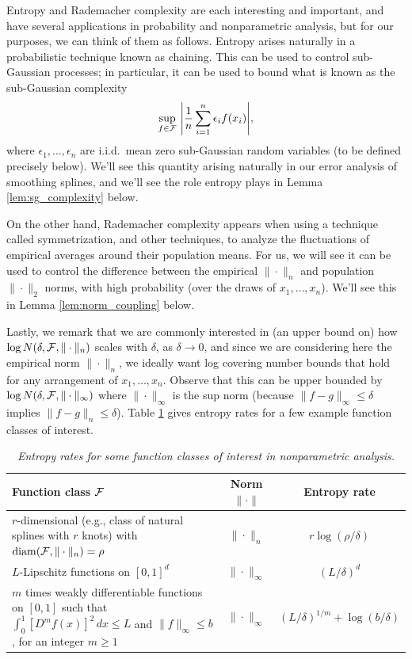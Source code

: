 \documentclass{article}
\begin{document}

Entropy and Rademacher complexity are each interesting and important, and have
several applications in probability and nonparametric analysis, but for our
purposes, we can think of them as follows. Entropy arises naturally in a
probabilistic technique known as chaining. This can be used to control
sub-Gaussian processes; in particular, it can be used to bound what is known as
the sub-Gaussian complexity   
\[
\sup_{f \in \mathcal{F}} \, \Bigg| \frac{1}{n} \sum_{i=1}^n \epsilon_i f(x_i) \Bigg|, 
\]
where $\epsilon_1,\dots,\epsilon_n$ are i.i.d.\ mean zero sub-Gaussian random
variables (to be defined precisely below). We'll see this quantity arising
naturally in our error analysis of smoothing splines, and we'll see the role
entropy plays in Lemma \ref{lem:sg_complexity} below. 

On the other hand, Rademacher complexity appears when using a technique called
symmetrization, and other techniques, to analyze the fluctuations of empirical
averages around their population means. For us, we will see it can be used to
control the difference between the empirical $\|\cdot\|_n$ and population
$\|\cdot\|_2$ norms, with high probability (over the draws of
$x_1,\dots,x_n$). We'll see this in Lemma \ref{lem:norm_coupling} below.     

Lastly, we remark that we are commonly interested in (an upper bound on) how
$\log N(\delta, \mathcal{F}, \|\cdot\|_n)$ scales with $\delta$, as $\delta \to 0$, and
since we are considering here the empirical norm $\|\cdot\|_n$, we ideally want
log covering number bounds that hold for any arrangement of
$x_1,\dots,x_n$. Observe that this can be upper bounded by $\log N(\delta, \mathcal{F}, 
\|\cdot\|_\infty)$ where $\|\cdot\|_\infty$ is the sup norm (because
$\|f-g\|_\infty \leq \delta$ implies $\|f-g\|_n \leq \delta$). Table
\ref{tab:entropy} gives entropy rates for a few example function classes of 
interest.  

\begin{table}[tb]
\centering
\renewcommand{\arraystretch}{1.5}
\begin{tabular}{m{3in}|c|c}
Function class $\mathcal{F}$ & Norm $\|\cdot\|$ & Entropy rate \\ \hline 
$r$-dimensional (e.g., class of natural splines with $r$ knots) with $\mathrm{diam}(\mathcal{F},
  \|\cdot\|_n) = \rho$ & $\|\cdot\|_n$ & $r \log(\rho/\delta)$ \\ \hline
$L$-Lipschitz functions on $[0,1]^d$ & $\|\cdot\|_\infty$ & $(L/\delta)^d$
  \\ \hline
$m$ times weakly differentiable functions on $[0,1]$ such that $\int_0^1 
[D^m f(x)]^2 \, dx \leq L$ and $\|f\|_\infty \leq b$, for an integer $m \geq 1$
& $\|\cdot\|_\infty$ & $(L/\delta)^{1/m} + \log(b/\delta)$ \\ \hline  
\end{tabular}
\caption{\it Entropy rates for some function classes of interest in
  nonparametric analysis.} 
\renewcommand{\arraystretch}{1}
\label{tab:entropy}
\end{table}
\end{document}

